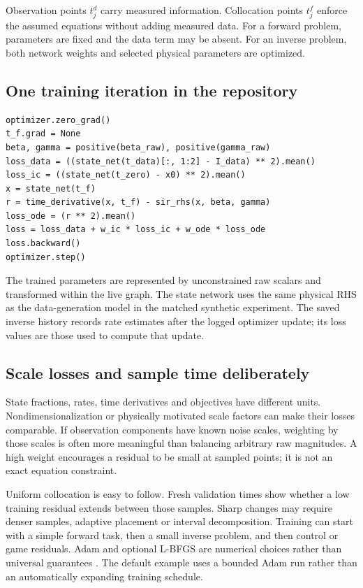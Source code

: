 \documentclass[11pt,a4paper]{article}
\theoremstyle{definition}
\theoremstyle{remark}
\begin{document}
Observation points $t_j^d$ carry measured information. Collocation points $t_j^f$ enforce the assumed equations without adding measured data. For a forward problem, parameters are fixed and the data term may be absent. For an inverse problem, both network weights and selected physical parameters are optimized.

\subsection{One training iteration in the repository}
\begin{lstlisting}[caption={The inverse learning loop in conceptual form}]
optimizer.zero_grad()
t_f.grad = None
beta, gamma = positive(beta_raw), positive(gamma_raw)
loss_data = ((state_net(t_data)[:, 1:2] - I_data) ** 2).mean()
loss_ic = ((state_net(t_zero) - x0) ** 2).mean()
x = state_net(t_f)
r = time_derivative(x, t_f) - sir_rhs(x, beta, gamma)
loss_ode = (r ** 2).mean()
loss = loss_data + w_ic * loss_ic + w_ode * loss_ode
loss.backward()
optimizer.step()
\end{lstlisting}
The trained parameters are represented by unconstrained raw scalars and transformed within the live graph. The state network uses the same physical RHS as the data-generation model in the matched synthetic experiment. The saved inverse history records rate estimates after the logged optimizer update; its loss values are those used to compute that update.

\subsection{Scale losses and sample time deliberately}
State fractions, rates, time derivatives and objectives have different units. Nondimensionalization or physically motivated scale factors can make their losses comparable. If observation components have known noise scales, weighting by those scales is often more meaningful than balancing arbitrary raw magnitudes. A high weight encourages a residual to be small at sampled points; it is not an exact equation constraint.

Uniform collocation is easy to follow. Fresh validation times show whether a low training residual extends between those samples. Sharp changes may require denser samples, adaptive placement or interval decomposition. Training can start with a simple forward task, then a small inverse problem, and then control or game residuals. Adam and optional L-BFGS are numerical choices rather than universal guarantees \cite{wang,krishnapriyan}. The default example uses a bounded Adam run rather than an automatically expanding training schedule.
\end{document}
